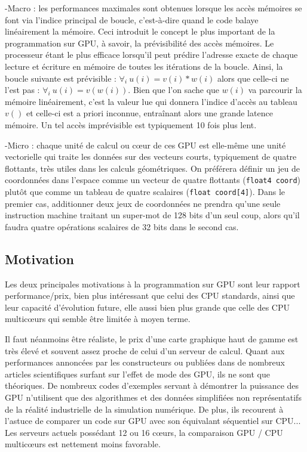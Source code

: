 \documentclass[a4paper,12pt]{article}
\begin{document}
-Macro : les performances maximales sont obtenues lorsque les accès mémoires se font via l'indice principal de boucle, c'est-à-dire quand le code balaye linéairement la mémoire. Ceci introduit le concept le plus important de la programmation sur GPU, à savoir, la prévisibilité des accès mémoires. Le processeur étant le plus efficace lorsqu'il peut prédire l'adresse exacte de chaque lecture et écriture en mémoire de toutes les itérations de la boucle. Ainsi, la boucle suivante est prévisible : $\forall_{i} ~u(i)=v(i)*w(i)$ alors que celle-ci ne l'est pas : $\forall_{i} ~u(i)=v(w(i))$. Bien que l'on sache que $w(i)$ va parcourir la mémoire linéairement, c'est la valeur lue qui donnera l'indice d'accès au tableau $v()$ et celle-ci est a priori inconnue, entraînant alors une grande latence mémoire. Un tel accès imprévisible est typiquement 10 fois plus lent.

-Micro : chaque unité de calcul ou c\oe ur de ces GPU est elle-même une unité vectorielle qui traite les données sur des vecteurs courts, typiquement de quatre flottants, très utiles dans les calculs géométriques. On préférera définir un jeu de coordonnées dans l'espace comme un vecteur de quatre flottants ({\tt float4 coord}) plutôt que comme un tableau de quatre scalaires ({\tt float coord[4]}). Dans le premier cas, additionner deux jeux de coordonnées ne prendra qu'une seule instruction machine traitant un super-mot de 128 bits d'un seul coup, alors qu'il faudra quatre op\'erations scalaires de 32 bits dans le second cas.

\subsection{Motivation}
Les deux principales motivations à la programmation sur GPU sont leur rapport performance/prix, bien plus intéressant que celui des CPU standards, ainsi que leur capacité d'évolution future, elle aussi bien plus grande que celle des CPU multic\oe urs qui semble être limitée à moyen terme.

Il faut néanmoins être réaliste, le prix d'une carte graphique haut de gamme est très élevé et souvent assez proche de celui d'un serveur de calcul. Quant aux performances annoncées par les constructeurs ou publiées dans de nombreux articles scientifiques surfant sur l'effet de mode des GPU, ils ne sont que théoriques. De nombreux codes d'exemples servant à démontrer la puissance des GPU n'utilisent que des algorithmes et des données simplifiées non représentatifs de la réalité industrielle de la simulation numérique. De plus, ils recourent à l'astuce de comparer un code sur GPU avec son équivalant séquentiel sur CPU... Les serveurs actuels possédant 12 ou 16 c\oe urs, la comparaison GPU / CPU multic\oe urs est nettement moins favorable.
\end{document}
